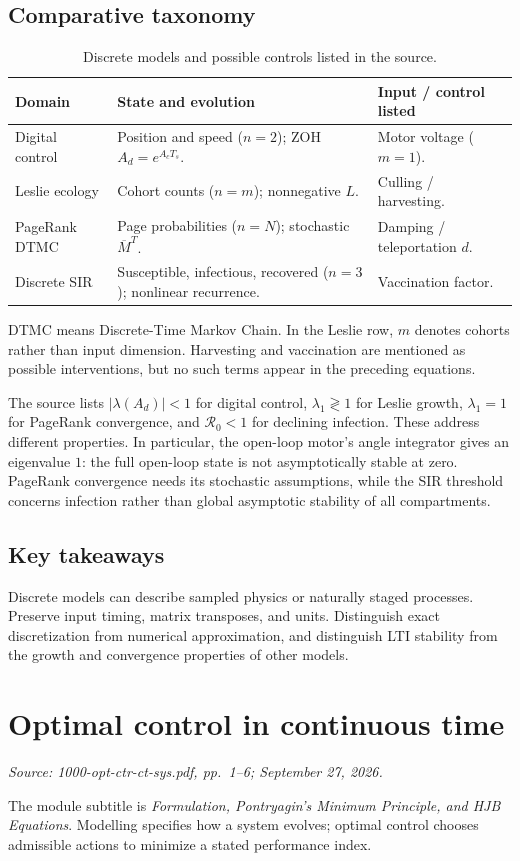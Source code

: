 \documentclass[11pt,a4paper]{article}
\numberwithin{equation}{section}
\numberwithin{figure}{section}
\numberwithin{table}{section}
\newcommand{\source}[1]{\par{\small\color{muted}\textit{Source: #1.}}\par}
\newcommand{\module}[2]{\clearpage\section{#1}\source{#2}}
\begin{document}
\subsection{Comparative taxonomy}
\begin{table}[htbp]\centering\small
\caption{Discrete models and possible controls listed in the source.}
\begin{tabularx}{\textwidth}{@{}P{24mm}YY@{}}\toprule
Domain & State and evolution & Input / control listed\\\midrule
Digital control & Position and speed ($n=2$); ZOH $A_d=e^{A_cT_s}$. & Motor voltage ($m=1$).\\\addlinespace
Leslie ecology & Cohort counts ($n=m$); nonnegative $L$. & Culling / harvesting.\\\addlinespace
PageRank DTMC & Page probabilities ($n=N$); stochastic $\overline M^T$. & Damping / teleportation $d$.\\\addlinespace
Discrete SIR & Susceptible, infectious, recovered ($n=3$); nonlinear recurrence. & Vaccination factor.\\\bottomrule
\end{tabularx}\end{table}
DTMC means Discrete-Time Markov Chain. In the Leslie row, $m$ denotes cohorts rather than input dimension. Harvesting and vaccination are mentioned as possible interventions, but no such terms appear in the preceding equations.

The source lists $|\lambda(A_d)|<1$ for digital control, $\lambda_1\gtrless1$ for Leslie growth, $\lambda_1=1$ for PageRank convergence, and $\mathcal R_0<1$ for declining infection. These address different properties. In particular, the open-loop motor's angle integrator gives an eigenvalue $1$: the full open-loop state is not asymptotically stable at zero. PageRank convergence needs its stochastic assumptions, while the SIR threshold concerns infection rather than global asymptotic stability of all compartments.
\FloatBarrier
\subsection{Key takeaways}
Discrete models can describe sampled physics or naturally staged processes. Preserve input timing, matrix transposes, and units. Distinguish exact discretization from numerical approximation, and distinguish LTI stability from the growth and convergence properties of other models.

\module{Optimal control in continuous time}{1000-opt-ctr-ct-sys.pdf, pp.\ 1--6; September 27, 2026}
The module subtitle is \emph{Formulation, Pontryagin's Minimum Principle, and HJB Equations}. Modelling specifies how a system evolves; optimal control chooses admissible actions to minimize a stated performance index.
\end{document}

